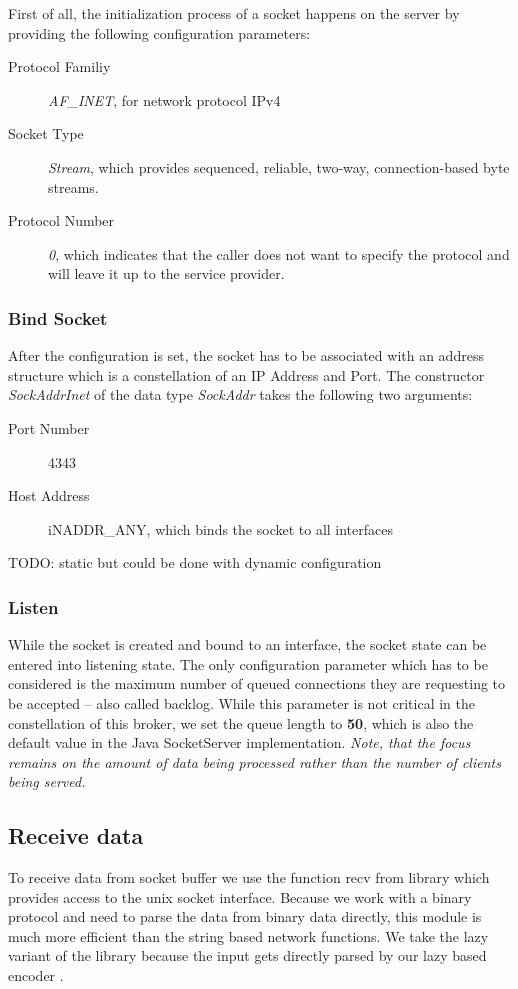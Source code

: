 First of all, the initialization process of a socket happens on the server by providing the following configuration parameters:
\begin{description}
  \item[Protocol Familiy] \textit{AF\_INET}, for network protocol IPv4
  \item[Socket Type] \textit{Stream}, which provides sequenced, reliable, two-way, connection-based byte streams.
  \item[Protocol Number] \textit{0}, which indicates that the caller does not want to specify the protocol and will leave it up to the service provider.
\end{description}

\subsubsection{Bind Socket}

After the configuration is set, the socket has to be associated with an address
structure which is a constellation of an IP Address and Port. The constructor
\textit{SockAddrInet} of the data type \textit{SockAddr} takes the following
two arguments:

\begin{description}
  \item[Port Number] 4343
  \item[Host Address] iNADDR\_ANY, which binds the socket to all interfaces
\end{description}

TODO: static but could be done with dynamic configuration

\subsubsection{Listen}

While the socket is created and bound to an interface, the socket state can be
entered into listening state. The only configuration parameter which has to be
considered is the maximum number of queued connections they are requesting to
be accepted -- also called backlog. While this parameter is not critical in the
constellation of this broker, we set the queue length to \textbf{50}, which is
also the default value in the Java SocketServer implementation. \textit{Note,
that the focus remains on the amount of data being processed rather than the
number of clients being served.}

\subsection{Receive data}
To receive data from socket buffer we use the function recv from
library which provides access to the unix socket interface. Because we work
with a binary protocol and need to parse the data from binary data directly,
this module is much more efficient than the string based network functions. We
take the lazy variant of the library because the input gets directly parsed by
our lazy based encoder .

